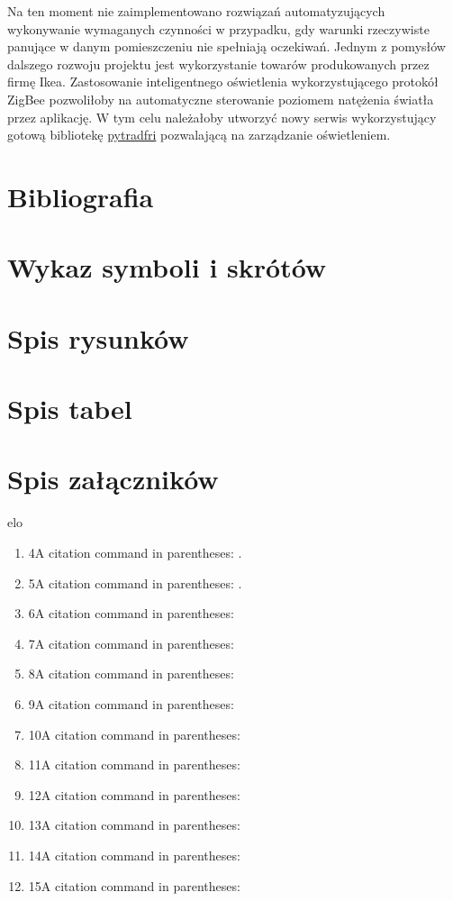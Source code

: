\documentclass[11pt, a4]{article} %
\begin{document}
Na ten moment nie zaimplementowano rozwiązań automatyzujących wykonywanie wymaganych 
czynności w przypadku, gdy warunki rzeczywiste panujące w danym pomieszczeniu nie 
spełniają oczekiwań. Jednym z pomysłów dalszego rozwoju projektu jest wykorzystanie 
towarów produkowanych przez firmę Ikea. Zastosowanie inteligentnego oświetlenia 
wykorzystującego protokół ZigBee pozwoliłoby na automatyczne sterowanie poziomem 
natężenia światła przez aplikację. W tym celu należałoby utworzyć nowy serwis 
wykorzystujący gotową bibliotekę \href{https://github.com/home-assistant-libs/pytradfri}{pytradfri} 
pozwalającą na zarządzanie oświetleniem.


\section{Bibliografia}
\printbibliography
\section{Wykaz symboli i skrótów}
\section{Spis rysunków}
\listoffigures
\section{Spis tabel}
\listoftables
\section{Spis załączników}
elo
\begin{enumerate}
    \item 4A citation command in parentheses: \parencite{chinchiuan:2014ac}.
    \item 5A citation command in parentheses: \parencite{dai:2014ad}.
    \item 6A citation command in parentheses: \parencite{fielding:1999ae}
    \item 7A citation command in parentheses: \parencite{hedge:2005af}
    \item 8A citation command in parentheses: \parencite{Imt.org:2015ag}
    \item 9A citation command in parentheses: \parencite{Lan:2012ah}
    \item 10A citation command in parentheses: \parencite{liu:2017aj}
    \item 11A citation command in parentheses: \parencite{oseland:2012ak}
    \item 12A citation command in parentheses: \parencite{richardson:2021al}
    \item 13A citation command in parentheses: \parencite{sharp:2022am}
    \item 14A citation command in parentheses: \parencite{vickers:2021an}
    \item 15A citation command in parentheses: \parencite{newman:2015ap}
    \end{enumerate}
\end{document}
